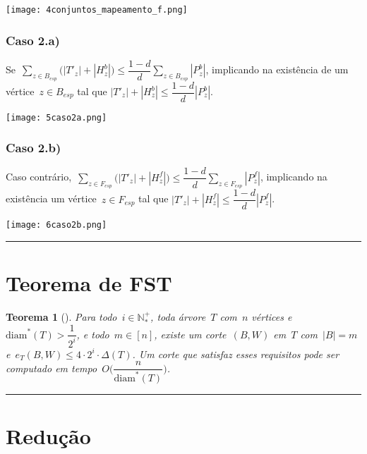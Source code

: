 \documentclass[a0,portrait]{a0poster}
\newtheorem{teo}{Teorema}
\newcommand{\diam}{\mathrm{diam}}
\begin{document}
\begin{multicols}{3}
\texttt{[image: 4conjuntos\_mapeamento\_f.png]}

\subsubsection*{Caso 2.a)}
Se~${\displaystyle\sum_{z\in B_{esp}}
\Big(|T'_{z}|+|H_z^b|\Big)\le
\dfrac{1-d}{d}\displaystyle\sum_{z\in B_{esp}}|P_z^b|}$,
implicando na existência de um vértice~${z\in B_{esp}}$ 
tal que ${|T'_{z}|+|H_z^b|\le
\dfrac{1-d}{d}|P_z^b|}$.

\texttt{[image: 5caso2a.png]}

\subsubsection*{Caso 2.b)}
Caso contrário,~${\displaystyle\sum_{z\in F_{esp}}
\Big(|T'_{z}|+|H_z^f|\Big)\le
\dfrac{1-d}{d}\displaystyle\sum_{z\in F_{esp}}|P_z^f|}$,
implicando na existência um vértice~${z\in F_{esp}}$ 
tal que ${|T'_{z}|+|H_z^f|\le
\dfrac{1-d}{d}|P_z^f|}$.

\texttt{[image: 6caso2b.png]}

\noindent\rule[0.5ex]{\linewidth}{1pt}

\section*{Teorema de FST}
\begin{teo}[]
	\label{teo:corteExato}
		Para todo~${i\in \mathbb{N^+_*}}$, toda árvore~$T$ com~$n$
		vértices e~${\diam^*(T)>\dfrac{1}{2^i}}$, e todo~${m\in[n]}$,
		existe um corte~$(B,W)$ em~$T$ com~${|B|=m}$ 
		e~$e_T(B,W)\le 4\cdot 2^i\cdot \Delta(T)$.
		Um corte que satisfaz esses requisitos pode ser computado
		em tempo~${O\Big(\dfrac{n}{\diam^*(T)}\Big)}$.
	\end{teo}
\noindent\rule[0.5ex]{\linewidth}{1pt}



\section*{Redução}


\end{multicols}
\end{document}
